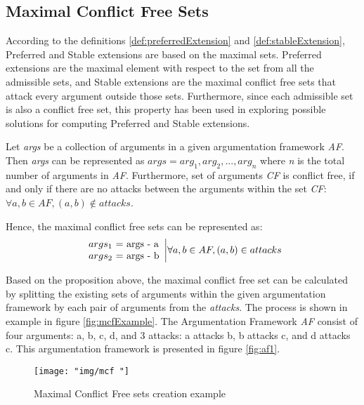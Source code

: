 \subsection{Maximal Conflict Free Sets} \label{section:maxConflictFreeSet}
According to the definitions \ref{def:preferredExtension} and \ref{def:stableExtension}, Preferred and Stable extensions are based on the maximal sets. Preferred extensions are the maximal element with respect to the set from all the admissible sets, and Stable extensions are the maximal conflict free sets that attack every argument outside those sets. Furthermore, since each admissible set is also a conflict free set, this property has been used in exploring possible solutions for computing Preferred and Stable extensions.

Let \textit{args} be a collection of arguments in a given argumentation framework \textit{AF}. Then \textit{args} can be represented as $args=arg_1, arg_2,...,arg_n$ where \textit{n} is the total number of arguments in \textit{AF}. 
Furthermore, set of arguments \textit{CF} is conflict free, if and only if there are no attacks between the arguments within the set \textit{CF}: $\forall a,b \in AF, (a, b) \notin attacks$.

Hence, the maximal conflict free sets can be represented as:
\begin{equation}
\begin{array}{lr}
args_1 $ = $ \text{args} $ - $ \text{a} \\
args_2 $ = $ \text{args} $ - $ \text{b} \\
\end{array} \bigg| \forall a, b \in AF, (a,b) \in attacks
\end{equation}

Based on the proposition above, the maximal conflict free set can be calculated by splitting the existing sets of arguments within the given argumentation framework by each pair of arguments from the \textit{attacks}. The process is shown in example in figure \ref{fig:mcfExample}. The Argumentation Framework \textit{AF} consist of four arguments: a, b, c, d, and 3 attacks: a attacks b, b attacks c, and d attacks c. This argumentation framework is presented in figure \ref{fig:af1}. 

\begin{figure}[h]
	\centering
	\texttt{[image: "img/mcf "]}
	\caption{Maximal Conflict Free sets creation example}
	\label{fig:mcf}
\end{figure}

